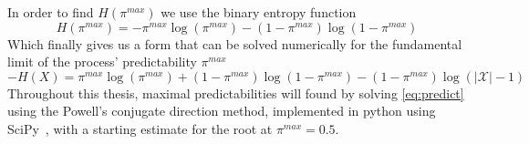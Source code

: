 In order to find $H(\pi^{max})$ we use the binary entropy function~\cite{songLimitsPredictabilityHuman2010}
\begin{equation}
H(\pi^{max}) = -\pi^{max} \log(\pi^{max}) - (1 -  \pi^{max}) \log(1 - \pi^{max})
\end{equation}
Which finally gives us a form that can be solved numerically for the fundamental limit of the process' predictability $\pi^{max}$
\begin{equation}\label{eq:predict}
-H(X)  = \pi^{max} \log(\pi^{max}) + (1 -  \pi^{max}) \log(1 - \pi^{max}) - (1 - \pi^{max}) \log (|\mathcal{X}| - 1)
\end{equation}
Throughout this thesis, maximal predictabilities will found by solving \autoref{eq:predict} using the Powell's conjugate direction method, implemented in python using SciPy~\cite{virtanenSciPyFundamentalAlgorithms2019}, with a starting estimate for the root at $\pi^{max}=0.5$.







